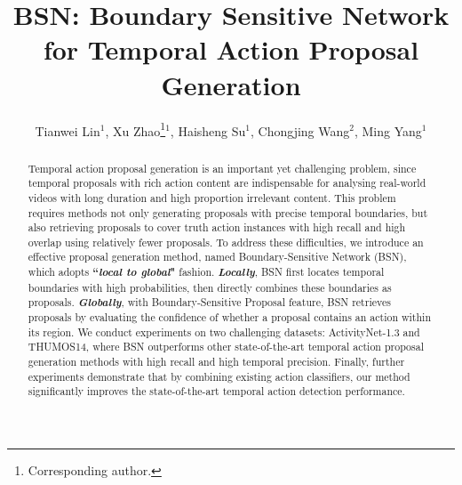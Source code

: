 \documentclass[runningheads]{llncs}
\begin{document}
\pagestyle{headings}
\mainmatter

\title{BSN: Boundary Sensitive Network for Temporal Action Proposal Generation} %






\author{Tianwei Lin$^1$, Xu Zhao\thanks{ Corresponding author.}$^1$, Haisheng Su$^1$, Chongjing Wang$^2$, Ming Yang$^1$}









\maketitle

\vspace{-0.5cm}

\begin{abstract}

Temporal action proposal generation is an important yet challenging problem, since temporal proposals with rich action content  are indispensable for analysing real-world videos with long duration and high proportion irrelevant content.
This problem requires methods not only generating proposals with precise temporal boundaries, but also retrieving proposals to cover truth action instances with high recall and high overlap using relatively fewer proposals.
To address these difficulties, we introduce an effective proposal generation method, named  Boundary-Sensitive Network (BSN), which adopts {\bf ``\emph{local to global}"} fashion.
{\bf \emph{Locally}}, BSN first locates temporal boundaries with high probabilities, then directly combines these boundaries as proposals.
{\bf \emph{Globally}},  with Boundary-Sensitive Proposal feature, BSN retrieves proposals by evaluating the confidence of whether a proposal contains an action within its region.
We conduct experiments on two challenging datasets: ActivityNet-1.3 and THUMOS14, where BSN outperforms other state-of-the-art temporal action proposal generation methods with high recall and high temporal precision.
Finally, further experiments demonstrate that by combining existing action classifiers, our method significantly improves the state-of-the-art temporal action detection performance.
\end{abstract}
\end{document}
